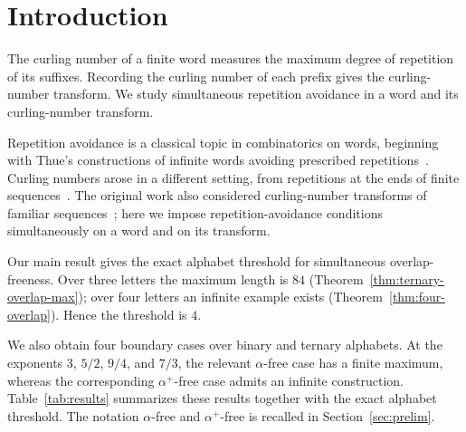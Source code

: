 \documentclass[12pt,reqno]{article}
\begin{document}
\section{Introduction}

The curling number of a finite word measures the maximum degree of repetition of its suffixes.  Recording the curling number of each prefix gives the curling-number transform.  We study simultaneous repetition avoidance in a word and its curling-number transform.

Repetition avoidance is a classical topic in combinatorics on words, beginning with Thue's constructions of infinite words avoiding prescribed repetitions~\cite{Thue:1912}.  Curling numbers arose in a different setting, from repetitions at the ends of finite sequences~\cite{Bult,Chaffin}.  The original work also considered curling-number transforms of familiar sequences~\cite{Bult}; here we impose repetition-avoidance conditions simultaneously on a word and on its transform.

Our main result gives the exact alphabet threshold for simultaneous overlap-freeness.  Over three letters the maximum length is $84$ (Theorem~\ref{thm:ternary-overlap-max}); over four letters an infinite example exists (Theorem~\ref{thm:four-overlap}).  Hence the threshold is $4$.

We also obtain four boundary cases over binary and ternary alphabets.  At the exponents $3$, $5/2$, $9/4$, and $7/3$, the relevant $\alpha$-free case has a finite maximum, whereas the corresponding $\alpha^+$-free case admits an infinite construction.  Table~\ref{tab:results} summarizes these results together with the exact alphabet threshold.  The notation $\alpha$-free and $\alpha^+$-free is recalled in Section~\ref{sec:prelim}.
\end{document}

